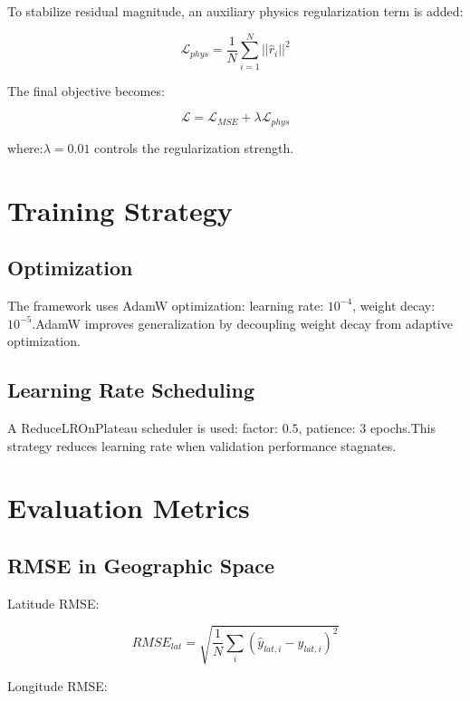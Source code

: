 \documentclass[11pt]{article}
\begin{document}
To stabilize residual magnitude, an auxiliary physics regularization term is added:

\begin{equation}
\mathcal{L}_{phys}
=
\frac{1}{N}
\sum_{i=1}^N
||\hat{r}_i||^2
\end{equation}

The final objective becomes:

\begin{equation}
\mathcal{L}
=
\mathcal{L}_{MSE}
+
\lambda
\mathcal{L}_{phys}
\end{equation}

where:$\lambda = 0.01$ controls the regularization strength.

\section{Training Strategy}

\subsection{Optimization}

    The framework uses AdamW optimization: learning rate: $10^{-4}$, weight decay: $10^{-5}$.AdamW improves generalization by decoupling weight decay from adaptive optimization.

\subsection{Learning Rate Scheduling}

A ReduceLROnPlateau scheduler is used: factor: $0.5$, patience: $3$ epochs.This strategy reduces learning rate when validation performance stagnates.

\section{Evaluation Metrics}

\subsection{RMSE in Geographic Space}

Latitude RMSE:

\begin{equation}
RMSE_{lat}
=
\sqrt{
\frac{1}{N}
\sum_i
(\hat{y}_{lat,i}-y_{lat,i})^2
}
\end{equation}

Longitude RMSE:
\end{document}

